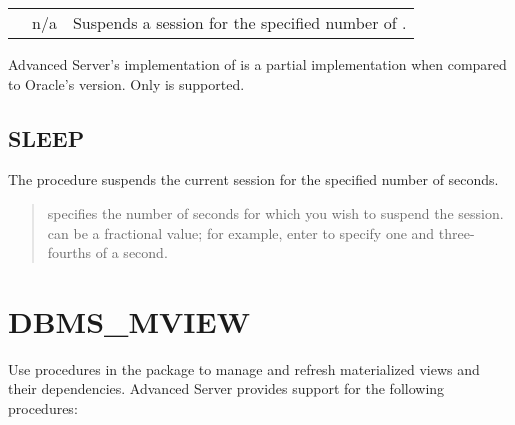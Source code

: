 \documentclass[letterpaper,10pt,english,openany,oneside]{sphinxmanual}
\begin{document}
\begin{savenotes}\sphinxattablestart
\centering
\begin{tabulary}{\linewidth}[t]{|T|T|T|}
\hline

&
&
\\
\hline
{}
&
n/a
&
Suspends a session for the specified number of .
\\
\hline
\end{tabulary}
\par
\sphinxattableend\end{savenotes}

Advanced Server’s implementation of  is a partial
implementation when compared to Oracle’s version. Only 
is supported.


\subsection{SLEEP}
\label{\detokenize{dbms_lock:sleep}}
The  procedure suspends the current session for the specified
number of seconds.



\begin{quote}

 specifies the number of seconds for which you wish to
suspend the session.  can be a fractional value; for
example, enter  to specify one and three-fourths of a second.
\end{quote}

\newpage


\section{DBMS\_MVIEW}
\label{\detokenize{dbms_mview::doc}}\label{\detokenize{dbms_mview:dbms-mview}}
Use procedures in the  package to manage and refresh
materialized views and their dependencies. Advanced Server provides
support for the following  procedures:
\end{document}
